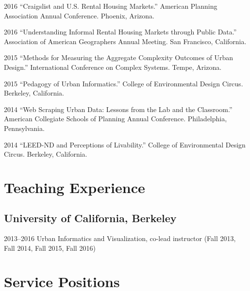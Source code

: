 \documentclass[12pt,letterpaper]{report}
\begin{document}
\begin{tablist}

\item[2016] \tab \enquote{Craigslist and U.S. Rental Housing Markets.} American Planning Association Annual Conference. Phoenix, Arizona.

\item[2016] \tab \enquote{Understanding Informal Rental Housing Markets through Public Data.} Association of American Geographers Annual Meeting. San Francisco, California.

\item[2015] \tab \enquote{Methods for Measuring the Aggregate Complexity Outcomes of Urban Design.} International Conference on Complex Systems. Tempe, Arizona.

\item[2015] \tab \enquote{Pedagogy of Urban Informatics.} College of Environmental Design Circus. Berkeley, California.

\item[2014] \tab \enquote{Web Scraping Urban Data: Lessons from the Lab and the Classroom.} American Collegiate Schools of Planning Annual Conference. Philadelphia, Pennsylvania.

\item[2014] \tab \enquote{LEED-ND and Perceptions of Livability.} College of Environmental Design Circus. Berkeley, California.

\end{tablist}



\section*{Teaching Experience}

\subsection*{University of California, Berkeley}

\begin{tablist}
\item[2013--2016] \tab Urban Informatics and Visualization, co-lead instructor (Fall 2013, Fall 2014, Fall 2015, Fall 2016)
\end{tablist}



\section*{Service Positions}
\end{document}
